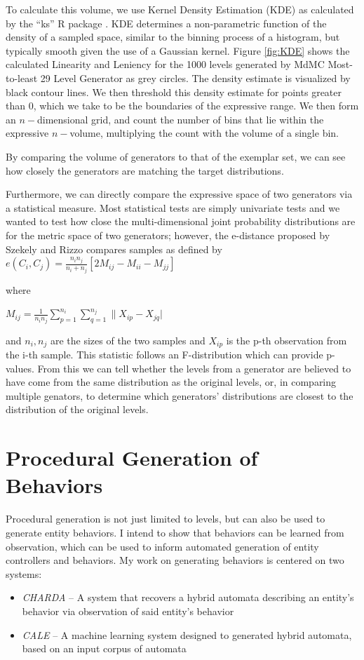 \documentclass[12pt]{report}
\begin{document}
To calculate this volume, we use Kernel Density Estimation (KDE) as calculated by the ``ks'' R package \cite{ks}.  KDE determines a non-parametric function of the density of a sampled space, similar to the binning process of a histogram, but typically smooth given the use of a Gaussian kernel.  Figure \ref{fig:KDE} shows the calculated Linearity and Leniency for the 1000 levels generated by MdMC Most-to-least 29 Level Generator as grey circles.  The density estimate is visualized by black contour lines.  We then threshold this density estimate for points greater than 0, which we take to be the boundaries of the expressive range.  We then form an $n-$dimensional grid, and count the number of bins that lie within the expressive $n-$volume, multiplying the count with the volume of a single bin.

By comparing the volume of generators to that of the exemplar set, we can see how closely the generators are matching the target distributions.

Furthermore, we can directly compare the expressive space of two generators via a statistical measure.  Most statistical tests are simply univariate tests and we wanted to test how close the multi-dimensional joint probability distributions are for the metric space of two generators; however, the e-distance proposed by Szekely and Rizzo \cite{szekely2013energy} compares samples as defined by
$e(C_i,C_j) = \frac{n_in_j}{n_i+n_j}[2M_{ij}-M_{ii}-M_{jj}]$

where

$M_{ij} = \frac{1}{n_in_j}\sum_{p=1}^{n_i}\sum_{q=1}^{n_j}\|X_{ip}-X_{jq}|$

and $n_i,n_j$ are the sizes of the two samples and $X_{ip}$ is the p-th observation from the i-th sample.   This statistic follows an F-distribution which can provide p-values.  From this we can tell whether the levels from a generator are believed to have come from the same distribution as the original levels, or, in comparing multiple genators, to determine which generators' distributions are closest to the distribution of the original levels.  








\chapter*{Procedural Generation of Behaviors}

Procedural generation is not just limited to levels, but can also be used to generate entity behaviors.  I intend to show that behaviors can be learned from observation, which can be used to inform automated generation of entity controllers and behaviors. My work on generating behaviors is centered on two systems: 
\begin{itemize}
\item \textit{CHARDA} -- A system that recovers a hybrid automata describing an entity's behavior via observation of said entity's behavior
\item \textit{CALE} -- A machine learning system designed to generated hybrid automata, based on an input corpus of automata
\end{itemize}
\end{document}
